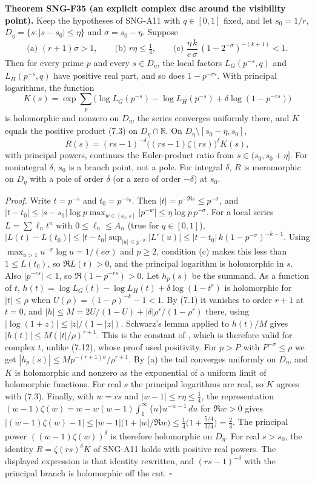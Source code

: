 \documentclass[
  11pt,
  a4paper,
]{report}
\let\singularitytexttt\texttt
\renewcommand{\texttt}[1]{\singularitytexttt{\seqsplit{#1}}}
\begin{document}
\textbf{Theorem SNG-F35 (an explicit complex disc around the visibility
point).} Keep the hypotheses of SNG-A11 with \(q\in[0,1]\) fixed, and
let \(s_0=1/r\), \(D_\eta=\{s:|s-s_0|\le\eta\}\) and
\(\sigma=s_0-\eta\). Suppose \[
\text{(a) }(r+1)\sigma>1,\qquad
\text{(b) }r\eta\le\tfrac14,\qquad
\text{(c) }\frac{\eta\,k}{e\,\sigma}\,(1-2^{-\sigma})^{-(k+1)}<1 .
\] Then for every prime \(p\) and every \(s\in D_\eta\), the local
factors \(L_G(p^{-s},q)\) and \(L_H(p^{-s},q)\) have positive real part,
and so does \(1-p^{-rs}\). With principal logarithms, the function \[
K(s)=\exp\sum_p\bigl(\log L_G(p^{-s})-\log L_H(p^{-s})+\delta\log(1-p^{-rs})\bigr)
\] is holomorphic and nonzero on \(D_\eta\), the series converges
uniformly there, and \(K\) equals the positive product (7.3) on
\(D_\eta\cap\mathbb R\). On \(D_\eta\setminus[s_0-\eta,s_0]\), \[
R(s)=(rs-1)^{-\delta}\bigl((rs-1)\zeta(rs)\bigr)^{\delta}K(s),
\] with principal powers, continues the Euler-product ratio from
\(s\in(s_0,s_0+\eta]\). For nonintegral \(\delta\), \(s_0\) is a branch
point, not a pole. For integral \(\delta\), \(R\) is meromorphic on
\(D_\eta\) with a pole of order \(\delta\) (or a zero of order
\(-\delta\)) at \(s_0\).

\emph{Proof.} Write \(t=p^{-s}\) and \(t_0=p^{-s_0}\). Then
\(|t|=p^{-\Re s}\le p^{-\sigma}\), and
\(|t-t_0|\le|s-s_0|\log p\max_{w\in[s_0,s]}|p^{-w}|\le\eta\log p\,p^{-\sigma}\).
For a local series \(L=\sum\ell_nt^n\) with \(0\le\ell_n\le A_n\) (true
for \(q\in[0,1]\)),
\(|L(t)-L(t_0)|\le|t-t_0|\sup_{|u|\le p^{-\sigma}}|L'(u)|\le|t-t_0|\,k(1-p^{-\sigma})^{-k-1}\).
Using \(\max_{u>1}u^{-\sigma}\log u=1/(e\sigma)\) and \(p\ge2\),
condition (c) makes this less than \(1\le L(t_0)\), so \(\Re L(t)>0\),
and the principal logarithm is holomorphic in \(s\). Also
\(|p^{-rs}|<1\), so \(\Re(1-p^{-rs})>0\). Let \(h_p(s)\) be the summand.
As a function of \(t\),
\(h(t)=\log L_G(t)-\log L_H(t)+\delta\log(1-t^r)\) is holomorphic for
\(|t|\le\rho\) when \(U(\rho)=(1-\rho)^{-k}-1<1\). By (7.1) it vanishes
to order \(r+1\) at \(t=0\), and
\(|h|\le M=2U/(1-U)+|\delta|\rho^r/(1-\rho^r)\) there, using
\(|\log(1+z)|\le|z|/(1-|z|)\). Schwarz's lemma applied to \(h(t)/M\)
gives \(|h(t)|\le M(|t|/\rho)^{r+1}\). This is the constant of
\texttt{normalized\_ratio\_tail\_constant}, which is therefore valid for
complex \(t\), unlike (7.12), whose proof used positivity. For \(p>P\)
with \(P^{-\sigma}\le\rho\) we get
\(|h_p(s)|\le Mp^{-(r+1)\sigma}/\rho^{r+1}\). By (a) the tail converges
uniformly on \(D_\eta\), and \(K\) is holomorphic and nonzero as the
exponential of a uniform limit of holomorphic functions. For real \(s\)
the principal logarithms are real, so \(K\) agrees with (7.3). Finally,
with \(w=rs\) and \(|w-1|\le r\eta\le\frac14\), the representation
\((w-1)\zeta(w)=w-w(w-1)\int_1^\infty\{u\}u^{-w-1}\,du\) for \(\Re w>0\)
gives
\(|(w-1)\zeta(w)-1|\le|w-1|\bigl(1+|w|/\Re w\bigr)\le\frac14\bigl(1+\frac{5/4}{3/4}\bigr)=\frac23\).
The principal power \(((w-1)\zeta(w))^\delta\) is therefore holomorphic
on \(D_\eta\). For real \(s>s_0\), the identity \(R=\zeta(rs)^\delta K\)
of SNG-A11 holds with positive real powers. The displayed expression is
that identity rewritten, and \((rs-1)^{-\delta}\) with the principal
branch is holomorphic off the cut. \(\square\)
\end{document}
